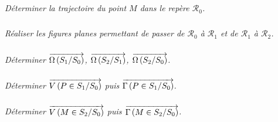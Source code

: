 \documentclass[10pt,oneside]{article}
\begin{document}
\subparagraph{}
\textit{Déterminer la trajectoire du point $M$ dans le repère $\mathcal{R}_0$.}


\subparagraph{}
\textit{Réaliser les figures planes permettant de passer de $\mathcal{R}_0$ à $\mathcal{R}_1$ et de $\mathcal{R}_1$ à $\mathcal{R}_2$.}



\subparagraph{}
\textit{Déterminer $\overrightarrow{\Omega\left( {S_1}/{S_0}\right)}$, $\overrightarrow{\Omega\left( {S_2}/{S_1}\right)}$, $\overrightarrow{\Omega\left( {S_2}/{S_0}\right)}$.}

\subparagraph{}
\textit{Déterminer $\overrightarrow{V\left( {P} \in {S_1}/{S_0}\right)}$ puis $\overrightarrow{\Gamma \left( {P} \in {S_1}/{S_0}\right)}$.} 

%
%

\subparagraph{}
\textit{Déterminer $\overrightarrow{V\left( {M} \in {S_2}/{S_0}\right)}$ puis $\overrightarrow{\Gamma \left( {M} \in {S_2}/{S_0}\right)}$.}
\end{document}
